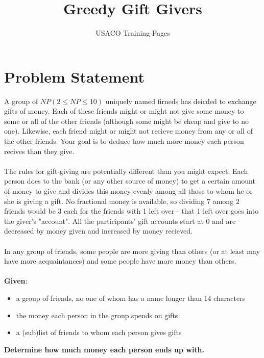 \documentclass{article}
\title{Greedy Gift Givers}
\author{USACO Training Pages}
\date{}
\begin{document}
\maketitle
\section*{Problem Statement}
A group of $NP (2 \leq NP \leq 10)$ uniquely named firneds has deicded to exchange gifts of money. Each of these friends might or might not give some money to some or all of the other friends (although some might be cheap and give to no one). Likewise, each friend might or might not recieve money from any or all of the other friends. Your goal is to deduce how much more money each person recives than they give.\\\\
The rules for gift-giving are potentially different than you might expect. Each person does to the bank (or any other source of money) to get a certain amount of money to give and divides this money evenly among all those to whom he or she is giving a gift. No fractional money is available, so dividing $7$ among $2$ friends would be $3$ each for the friends with 1 left over - that 1 left over goes into the giver's "account". All the participants' gift accounts start at 0 and are decreased by money given and increased by money recieved.\\\\
In any group of friends, some people are more giving than others (or at least may have more acquaintances) and some people have more money than others.\\\\
\textbf{Given}:
\begin{itemize}
\item a group of friends, no one of whom has a name longer than 14 characters
\item the money each person in the group spends on gifts
\item a (sub)list of friends to whom each person gives gifts\\
\end{itemize}
\textbf{Determine how much money each person ends up with.}
\end{document}
